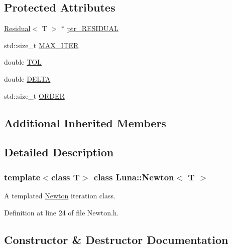 \subsection*{Protected Attributes}
\begin{DoxyCompactItemize}
\item 
\hyperlink{classLuna_1_1Residual}{Residual}$<$ T $>$ $\ast$ \hyperlink{classLuna_1_1Newton_a5cb2983ea8e24c4832a3fb0bdde84b8f}{ptr\+\_\+\+R\+E\+S\+I\+D\+U\+AL}
\item 
std\+::size\+\_\+t \hyperlink{classLuna_1_1Newton_ac8245444273c58c656a78ab0544833ce}{M\+A\+X\+\_\+\+I\+T\+ER}
\item 
double \hyperlink{classLuna_1_1Newton_a13234002150648ac70297ef68a41c9c7}{T\+OL}
\item 
double \hyperlink{classLuna_1_1Newton_ad4862420392d9eb80d135b9c28dd47cb}{D\+E\+L\+TA}
\item 
std\+::size\+\_\+t \hyperlink{classLuna_1_1Newton_a7d549b60ff6d4285d8cbbf6f958c7d88}{O\+R\+D\+ER}
\end{DoxyCompactItemize}
\subsection*{Additional Inherited Members}


\subsection{Detailed Description}
\subsubsection*{template$<$class T$>$\newline
class Luna\+::\+Newton$<$ T $>$}

A templated \hyperlink{classLuna_1_1Newton}{Newton} iteration class. 

Definition at line 24 of file Newton.\+h.



\subsection{Constructor \& Destructor Documentation}
\mbox{\label{classLuna_1_1Newton_a062c2b36d5e7d345173c0b2b525b3f9d}} 
